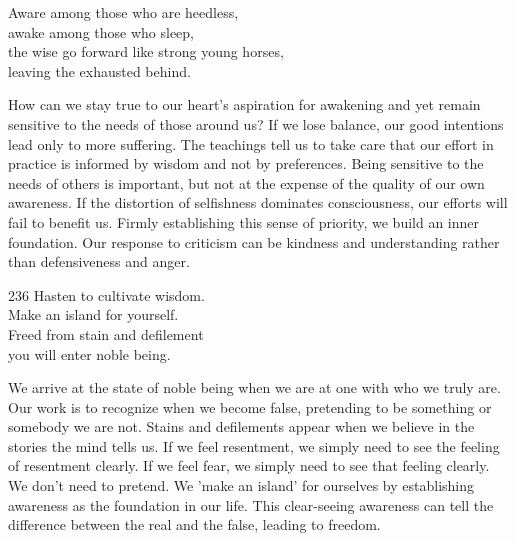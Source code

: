 
\begin{dhpVerse}{29}
\label{dhp-29}
Aware among those who are heedless,\\
awake among those who sleep,\\
the wise go forward like strong young horses,\\
leaving the exhausted behind.
\end{dhpVerse}

\begin{dhpRefl}
  How can we stay true to our heart’s aspiration for awakening and yet remain
  sensitive to the needs of those around us? If we lose balance, our good
  intentions lead only to more suffering. The teachings tell us to take care
  that our effort in practice is informed by wisdom and not by preferences.
  Being sensitive to the needs of others is important, but not at the expense of
  the quality of our own awareness. If the distortion of selfishness dominates
  consciousness, our efforts will fail to benefit us. Firmly establishing this
  sense of priority, we build an inner foundation. Our response to criticism can
  be kindness and understanding rather than defensiveness and anger.
\end{dhpRefl}


\begin{dhpVerse}{236}
\label{dhp-236}
Hasten to cultivate wisdom.\\
Make an island for yourself.\\
Freed from stain and defilement\\
you will enter noble being.
\end{dhpVerse}

\begin{dhpRefl}
  We arrive at the state of noble being when we are at one with who we truly
  are. Our work is to recognize when we become false, pretending to be something
  or somebody we are not. Stains and defilements appear when we believe in the
  stories the mind tells us. If we feel resentment, we simply need to see the
  feeling of resentment clearly. If we feel fear, we simply need to see that
  feeling clearly. We don't need to pretend. We 'make an island' for ourselves
  by establishing awareness as the foundation in our life. This clear-seeing
  awareness can tell the difference between the real and the false, leading to
  freedom.
\end{dhpRefl}


